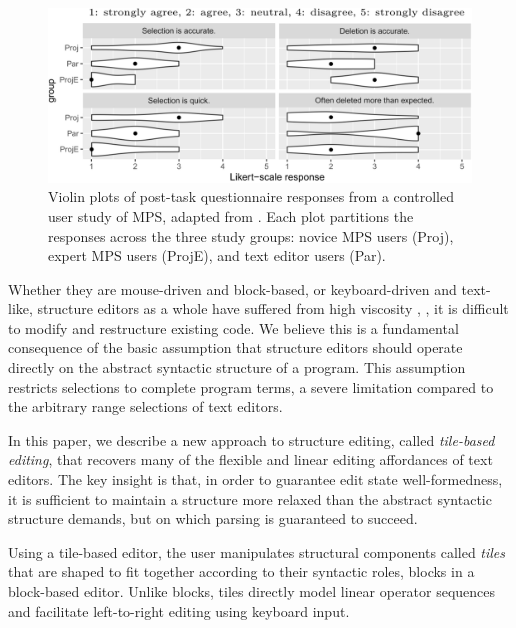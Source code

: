 \begin{figure}[b]
  \centering
  \includegraphics[width=\columnwidth]{img/mps-violin-plots.png}
  \caption{Violin plots of post-task questionnaire responses
  from a controlled user study of MPS, adapted from \cite{ProjEfficiency}.
  Each plot partitions the responses across the three study groups:
  novice MPS users (Proj), expert MPS users (ProjE),
  and text editor users (Par).
  }
  \label{fig:mps-violin-plots}
\end{figure}

Whether they are mouse-driven and block-based,
or keyboard-driven and text-like,
structure editors as a whole have suffered
from high viscosity \cite{cog-dim},
\ie, it is difficult to modify
and restructure existing code.
We believe this is a fundamental consequence
of the basic assumption that structure editors
should operate directly on the abstract syntactic structure
of a program.
This assumption restricts selections to complete
program terms, a severe limitation compared to
the arbitrary range selections of text editors.

In this paper, we describe a new approach to structure
editing, called \emph{tile-based editing}, that
recovers many of the flexible and linear editing
affordances of text editors.
The key insight is that, in order to guarantee edit state
well-formedness, it is sufficient to maintain a structure
more relaxed than the abstract syntactic structure demands,
but on which parsing is guaranteed to succeed.

Using a tile-based editor, the user manipulates
structural components called \emph{tiles} that
are shaped to fit together according to their
syntactic roles, \ala blocks in a block-based editor.
Unlike blocks, tiles directly model linear
operator sequences and facilitate left-to-right
editing using keyboard input.

